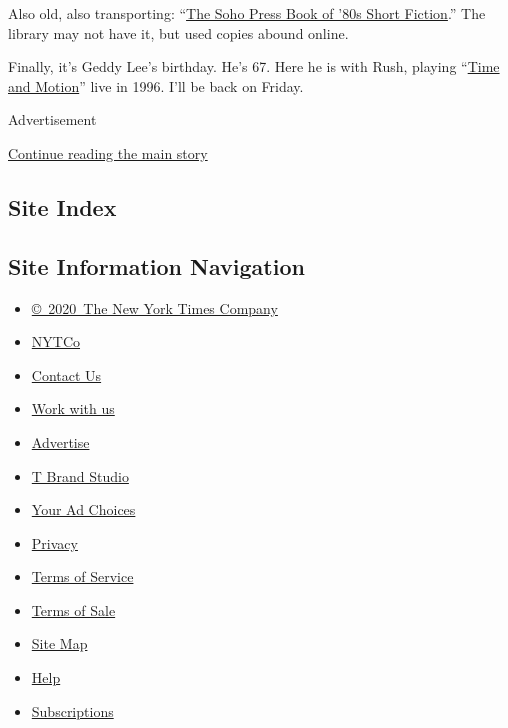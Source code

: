 Also old, also transporting:
``\href{https://bookshop.org/books/the-soho-press-book-of-80s-short-fiction/9781616955465}{The
Soho Press Book of '80s Short Fiction}.'' The library may not have it,
but used copies abound online.

Finally, it's Geddy Lee's birthday. He's 67. Here he is with Rush,
playing ``\href{https://www.youtube.com/watch?v=3GS3sQxRciY}{Time and
Motion}'' live in 1996. I'll be back on Friday.

Advertisement

\protect\hyperlink{after-bottom}{Continue reading the main story}

\hypertarget{site-index}{%
\subsection{Site Index}\label{site-index}}

\hypertarget{site-information-navigation}{%
\subsection{Site Information
Navigation}\label{site-information-navigation}}

\begin{itemize}
\tightlist
\item
  \href{https://help.nytimes.com/hc/en-us/articles/115014792127-Copyright-notice}{©~2020~The
  New York Times Company}
\end{itemize}

\begin{itemize}
\tightlist
\item
  \href{https://www.nytco.com/}{NYTCo}
\item
  \href{https://help.nytimes.com/hc/en-us/articles/115015385887-Contact-Us}{Contact
  Us}
\item
  \href{https://www.nytco.com/careers/}{Work with us}
\item
  \href{https://nytmediakit.com/}{Advertise}
\item
  \href{http://www.tbrandstudio.com/}{T Brand Studio}
\item
  \href{https://www.nytimes.com/privacy/cookie-policy\#how-do-i-manage-trackers}{Your
  Ad Choices}
\item
  \href{https://www.nytimes.com/privacy}{Privacy}
\item
  \href{https://help.nytimes.com/hc/en-us/articles/115014893428-Terms-of-service}{Terms
  of Service}
\item
  \href{https://help.nytimes.com/hc/en-us/articles/115014893968-Terms-of-sale}{Terms
  of Sale}
\item
  \href{https://spiderbites.nytimes.com}{Site Map}
\item
  \href{https://help.nytimes.com/hc/en-us}{Help}
\item
  \href{https://www.nytimes.com/subscription?campaignId=37WXW}{Subscriptions}
\end{itemize}
